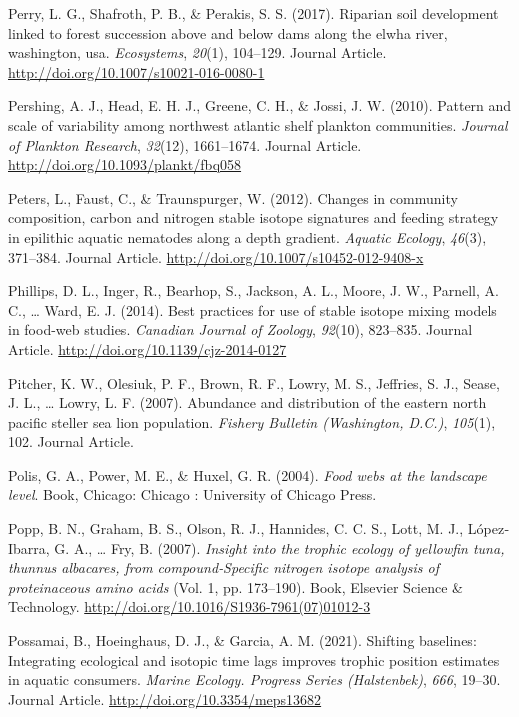 \documentclass [11pt, proquest] {uwthesis}[2015/03/03]
\begin{document}
\hypertarget{ref-Perry2017}{}
Perry, L. G., Shafroth, P. B., \& Perakis, S. S. (2017). Riparian soil
development linked to forest succession above and below dams along the
elwha river, washington, usa. \emph{Ecosystems}, \emph{20}(1), 104--129.
Journal Article. \url{http://doi.org/10.1007/s10021-016-0080-1}

\hypertarget{ref-Pershing2010}{}
Pershing, A. J., Head, E. H. J., Greene, C. H., \& Jossi, J. W. (2010).
Pattern and scale of variability among northwest atlantic shelf plankton
communities. \emph{Journal of Plankton Research}, \emph{32}(12),
1661--1674. Journal Article. \url{http://doi.org/10.1093/plankt/fbq058}

\hypertarget{ref-Peters2012}{}
Peters, L., Faust, C., \& Traunspurger, W. (2012). Changes in community
composition, carbon and nitrogen stable isotope signatures and feeding
strategy in epilithic aquatic nematodes along a depth gradient.
\emph{Aquatic Ecology}, \emph{46}(3), 371--384. Journal Article.
\url{http://doi.org/10.1007/s10452-012-9408-x}

\hypertarget{ref-Phillips2014}{}
Phillips, D. L., Inger, R., Bearhop, S., Jackson, A. L., Moore, J. W.,
Parnell, A. C., \ldots{} Ward, E. J. (2014). Best practices for use of
stable isotope mixing models in food-web studies. \emph{Canadian Journal
of Zoology}, \emph{92}(10), 823--835. Journal Article.
\url{http://doi.org/10.1139/cjz-2014-0127}

\hypertarget{ref-Pitcher2007}{}
Pitcher, K. W., Olesiuk, P. F., Brown, R. F., Lowry, M. S., Jeffries, S.
J., Sease, J. L., \ldots{} Lowry, L. F. (2007). Abundance and
distribution of the eastern north pacific steller sea lion population.
\emph{Fishery Bulletin (Washington, D.C.)}, \emph{105}(1), 102. Journal
Article.

\hypertarget{ref-Polis2004}{}
Polis, G. A., Power, M. E., \& Huxel, G. R. (2004). \emph{Food webs at
the landscape level}. Book, Chicago: Chicago : University of Chicago
Press.

\hypertarget{ref-Popp2007}{}
Popp, B. N., Graham, B. S., Olson, R. J., Hannides, C. C. S., Lott, M.
J., López‐Ibarra, G. A., \ldots{} Fry, B. (2007). \emph{Insight into the
trophic ecology of yellowfin tuna, thunnus albacares, from
compound‐Specific nitrogen isotope analysis of proteinaceous amino
acids} (Vol. 1, pp. 173--190). Book, Elsevier Science \& Technology.
\url{http://doi.org/10.1016/S1936-7961(07)01012-3}

\hypertarget{ref-Possamai2021}{}
Possamai, B., Hoeinghaus, D. J., \& Garcia, A. M. (2021). Shifting
baselines: Integrating ecological and isotopic time lags improves
trophic position estimates in aquatic consumers. \emph{Marine Ecology.
Progress Series (Halstenbek)}, \emph{666}, 19--30. Journal Article.
\url{http://doi.org/10.3354/meps13682}
\end{document}
